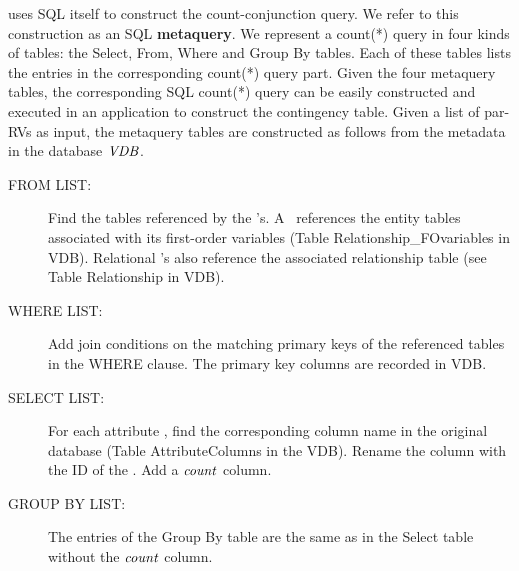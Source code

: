 \FB  uses SQL itself to construct the count-conjunction query. We refer to this construction as an SQL \textbf{metaquery}. We represent a count(*) query in 
four kinds of tables: the Select, From, Where and Group By tables. Each of these tables lists the entries in the corresponding count(*) query part.
%
Given the four metaquery tables, the corresponding SQL count(*) query can be easily constructed and executed in an application to construct the contingency table.
Given a list of par-RVs as input, the metaquery tables are constructed as follows
from the metadata in the database ${\it VDB }$.  




\begin{description}
\item[FROM LIST:] Find the tables referenced by the \RRV's. A \RRV ~references the entity tables associated with its first-order variables (Table Relationship\_FOvariables in VDB). Relational \RRV's also reference the associated relationship table (see Table Relationship in VDB). 
\item[WHERE LIST:] Add join conditions on the matching primary keys of the referenced tables in the WHERE clause. The primary key columns are recorded in VDB. 
\item[SELECT LIST:] For each attribute \RRV, find the corresponding column name in the original database (Table AttributeColumns in the VDB). Rename the column with the ID of the \RRV. Add a $\it{count}$ column.
\item[GROUP BY LIST:] The entries of the Group By table are the same as in the Select table without the $\it{count}$ column.
\end{description}


